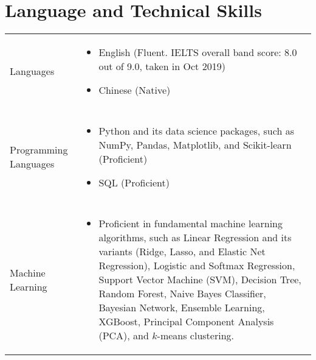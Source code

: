 \documentclass[10pt, oneside]{article}
\begin{document}
\section*{Language and Technical Skills}
\begin{tabularx}{\linewidth}{p{2.2cm}|p{16cm}}
	\toprule 
	Languages
	& \begin{itemize}
		\item English (Fluent. IELTS overall band score: 8.0 out of 9.0, taken in Oct 2019)
		\item Chinese (Native)
	\end{itemize}
	\\\\
	Programming Languages
	& \begin{itemize}
		\item Python and its data science packages, such as NumPy, Pandas, Matplotlib, and Scikit-learn (Proficient)
		\item SQL (Proficient)
	\end{itemize}
	\\\\
	Machine Learning
	& \begin{itemize}
		\item Proficient in fundamental machine learning algorithms, such as Linear 
		Regression and its variants (Ridge, Lasso, and Elastic Net Regression), Logistic and Softmax Regression, Support Vector Machine (SVM), Decision Tree, Random Forest, Naive Bayes Classifier, Bayesian Network, Ensemble Learning, XGBoost, Principal Component Analysis (PCA), and $k$-means clustering.

\end{itemize}
\end{tabularx}
\end{document}
